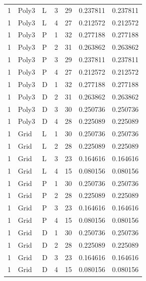 \begin{longtable}{lllrrrr}
1 & Poly3 & L & 3 & 29 & 0.237811 & 0.237811 \\
1 & Poly3 & L & 4 & 27 & 0.212572 & 0.212572 \\
1 & Poly3 & P & 1 & 32 & 0.277188 & 0.277188 \\
1 & Poly3 & P & 2 & 31 & 0.263862 & 0.263862 \\
1 & Poly3 & P & 3 & 29 & 0.237811 & 0.237811 \\
1 & Poly3 & P & 4 & 27 & 0.212572 & 0.212572 \\
1 & Poly3 & D & 1 & 32 & 0.277188 & 0.277188 \\
1 & Poly3 & D & 2 & 31 & 0.263862 & 0.263862 \\
1 & Poly3 & D & 3 & 30 & 0.250736 & 0.250736 \\
1 & Poly3 & D & 4 & 28 & 0.225089 & 0.225089 \\
1 & Grid & L & 1 & 30 & 0.250736 & 0.250736 \\
1 & Grid & L & 2 & 28 & 0.225089 & 0.225089 \\
1 & Grid & L & 3 & 23 & 0.164616 & 0.164616 \\
1 & Grid & L & 4 & 15 & 0.080156 & 0.080156 \\
1 & Grid & P & 1 & 30 & 0.250736 & 0.250736 \\
1 & Grid & P & 2 & 28 & 0.225089 & 0.225089 \\
1 & Grid & P & 3 & 23 & 0.164616 & 0.164616 \\
1 & Grid & P & 4 & 15 & 0.080156 & 0.080156 \\
1 & Grid & D & 1 & 30 & 0.250736 & 0.250736 \\
1 & Grid & D & 2 & 28 & 0.225089 & 0.225089 \\
1 & Grid & D & 3 & 23 & 0.164616 & 0.164616 \\
1 & Grid & D & 4 & 15 & 0.080156 & 0.080156 \\
\end{longtable}
\endgroup


